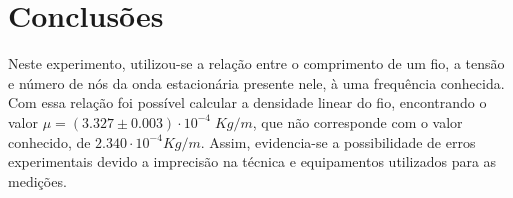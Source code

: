 \documentclass[12pt,a4paper]{article}
\begin{document}
\section{Conclusões}

Neste experimento, utilizou-se a relação entre o comprimento de um fio, a tensão e número de nós da onda estacionária presente nele, à uma frequência conhecida. Com essa relação foi possível calcular a densidade linear do fio, encontrando o valor 
$ \mu = (3.327 \pm 0.003)  \cdot 10^{-4} \; Kg/m$, que não corresponde com o valor conhecido, de $2.340 \cdot 10^{-4} Kg/m$. Assim, evidencia-se a possibilidade de erros experimentais devido a imprecisão na técnica e equipamentos utilizados para as medições.
\end{document}
